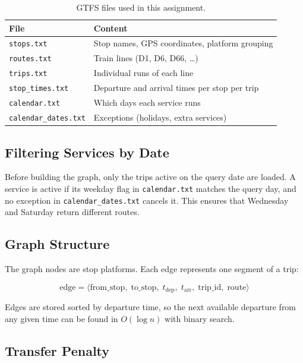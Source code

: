 \documentclass[12pt,a4paper]{article}
\begin{document}
\begin{table}[H]
\centering
\begin{tabular}{ll}
\toprule
\textbf{File} & \textbf{Content} \\
\midrule
\texttt{stops.txt}           & Stop names, GPS coordinates, platform grouping \\
\texttt{routes.txt}          & Train lines (D1, D6, D66, \ldots) \\
\texttt{trips.txt}           & Individual runs of each line \\
\texttt{stop\_times.txt}     & Departure and arrival times per stop per trip \\
\texttt{calendar.txt}        & Which days each service runs \\
\texttt{calendar\_dates.txt} & Exceptions (holidays, extra services) \\
\bottomrule
\end{tabular}
\caption{GTFS files used in this assignment.}
\end{table}

\subsection{Filtering Services by Date}

Before building the graph, only the trips active on the query date are loaded.
A service is active if its weekday flag in \texttt{calendar.txt} matches the
query day, and no exception in \texttt{calendar\_dates.txt} cancels it.
This ensures that Wednesday and Saturday return different routes.

\subsection{Graph Structure}

The graph nodes are stop platforms. Each edge represents one segment of a trip:

\[
  \text{edge} = \langle \text{from\_stop},\; \text{to\_stop},\;
  t_{\text{dep}},\; t_{\text{arr}},\; \text{trip\_id},\; \text{route} \rangle
\]

Edges are stored sorted by departure time, so the next available departure from
any given time can be found in $O(\log n)$ with binary search.

\subsection{Transfer Penalty}
\end{document}
